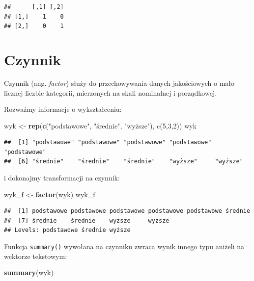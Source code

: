 \documentclass[]{book}
\newenvironment{Shaded}{\begin{snugshade}}{\end{snugshade}}
\newcommand{\KeywordTok}[1]{\textcolor[rgb]{0.13,0.29,0.53}{\textbf{#1}}}
\newcommand{\StringTok}[1]{\textcolor[rgb]{0.31,0.60,0.02}{#1}}
\newcommand{\NormalTok}[1]{#1}
\begin{document}
\begin{verbatim}
##      [,1] [,2]
## [1,]    1    0
## [2,]    0    1
\end{verbatim}

\section{Czynnik}\label{czynnik}

Czynnik (ang. \emph{factor}) służy do przechowywania danych jakościowych
o mało licznej liczbie kategorii, mierzonych na skali nominalnej i
porządkowej.

Rozważmy informacje o wykształceniu:

\begin{Shaded}
\begin{Highlighting}[]
\NormalTok{wyk <-}\StringTok{ }\KeywordTok{rep}\NormalTok{(}\KeywordTok{c}\NormalTok{(}\StringTok{"podstawowe"}\NormalTok{, }\StringTok{"średnie"}\NormalTok{, }\StringTok{"wyższe"), c(5,3,2))}
\StringTok{wyk}
\end{Highlighting}
\end{Shaded}

\begin{verbatim}
##  [1] "podstawowe" "podstawowe" "podstawowe" "podstawowe" "podstawowe"
##  [6] "średnie"    "średnie"    "średnie"    "wyższe"     "wyższe"
\end{verbatim}

i dokonajmy transformacji na czynnik:

\begin{Shaded}
\begin{Highlighting}[]
\NormalTok{wyk_f <-}\StringTok{ }\KeywordTok{factor}\NormalTok{(wyk)}
\NormalTok{wyk_f}
\end{Highlighting}
\end{Shaded}

\begin{verbatim}
##  [1] podstawowe podstawowe podstawowe podstawowe podstawowe średnie   
##  [7] średnie    średnie    wyższe     wyższe    
## Levels: podstawowe średnie wyższe
\end{verbatim}

Funkcja \texttt{summary()} wywołana na czynniku zwraca wynik innego typu
aniżeli na wektorze tekstowym:

\begin{Shaded}
\begin{Highlighting}[]
\KeywordTok{summary}\NormalTok{(wyk)}
\end{Highlighting}
\end{Shaded}
\end{document}

